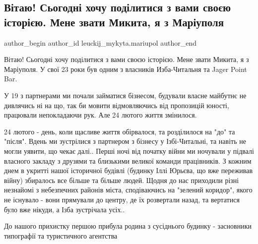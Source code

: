  
 
 
 
 

\subsection{Вітаю! Сьогодні хочу поділитися з вами своєю історією. Мене звати Микита, я з Маріуполя}
\label{sec:22_06_2022.fb.leuckij_mykyta.mariupol.1.istoria}

\ifcmt
 author_begin
   author_id leuckij_mykyta.mariupol
 author_end
\fi

Вітаю! Сьогодні хочу поділитися з вами своєю історією. Мене звати Микита, я з
Маріуполя. У свої 23 роки був одним з власників Изба-Читальня та Jager Point
Bar.

У 19 з партнерами ми почали займатися бізнесом, будували власне майбутнє не
дивлячись ні на що, так би мовити відмовляючись від пропозицій юності,
працювали непокладаючи рук. Але 24 лютого життя змінилося. 

24 лютого - день, коли щасливе життя обірвалося, та розділилося на "до" та
"після". Вдень ми зустрілися з партнером з бізнесу у Ізбі-Читальні, та навіть
не могли уявити, що чекає далі.. Перші ночі від початку війни ми ночували у
підвалі власного закладу з друзями та близькими великої команди працівників. З
кожним днем в укритті нашої історичної будівлі (будинку Іллі Юрьєва, що вже
переживав війну) збиралось все більше та більше людей. Щодня до нас приходили
різні незнайомі з небезпечних районів міста, сподіваючись на "зелений коридор",
якого не існувало - вони прямували до центру, де їх розвертали назад, та
вертатися було вже нікуди, а Ізба зустрічала усіх.. 

До нашого прихистку першою прибула родина з сусіднього будинку - засновники
типографії  та туристичного агентства

